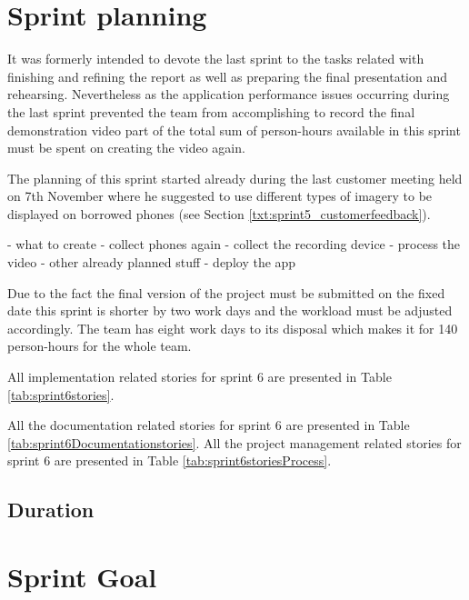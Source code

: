 \section{Sprint planning}
It was formerly intended to devote the last sprint to the tasks related with finishing and refining the report as well as preparing the final presentation and rehearsing. Nevertheless as the application performance issues occurring during the last sprint prevented the team from accomplishing to record the final demonstration video part of the total sum of person-hours available in this sprint must be spent on creating the video again.

The planning of this sprint started already during the last customer meeting held on 7th November where he suggested to use different types of imagery to be displayed on borrowed phones (see Section \ref{txt:sprint5_customerfeedback}). 

- what to create
- collect phones again
- collect the recording device
- process the video
- other already planned stuff
- deploy the app

Due to the fact the final version of the project must be submitted on the fixed date this sprint is shorter by two work days and the workload must be adjusted accordingly. The team has eight work days to its disposal which makes it for 140 person-hours for the whole team.

All implementation related stories for sprint 6 are presented in Table \ref{tab:sprint6stories}.

All the documentation related stories for sprint 6 are presented in Table \ref{tab:sprint6Documentationstories}. 
 All the project management related stories for sprint 6 are presented in Table \ref{tab:sprint6storiesProcess}.


\subsection{Duration}

\section{Sprint Goal}

